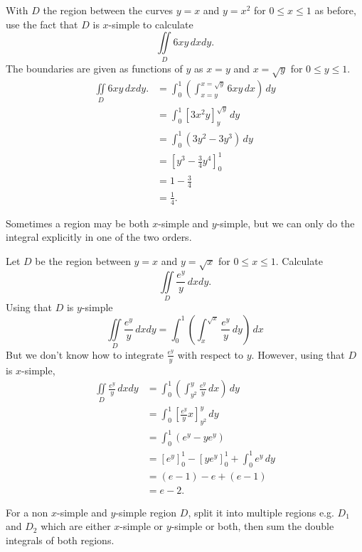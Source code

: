 \documentclass[10pt, a4paper]{article}
\begin{document}
\begin{example}
    With $D$ the region between the curves $y = x$ and $y = x ^ 2$ for $0 \leq x \leq 1$ as before,
    use the fact that $D$ is $x$-simple to calculate
    \[
    \iint\limits_{D}6xy\,dxdy.
    \]
    The boundaries are given as functions of $y$ as $x = y$ and $x = \sqrt{y}$ for $0 \leq y \leq 1$.
    \begin{align*}
        \iint\limits_{D}6xy\,dxdy. &= \int_0^1\left(\int_{x = y}^{x = \sqrt{y}}6xy\,dx\right)\,dy \\
        &= \int_0^1\left[3x ^ 2y\right]_{y}^{\sqrt{y}}\,dy \\
        &= \int_0^1\left(3y ^ 2 - 3y ^ 3\right)\,dy \\
        &= \left[y ^ 3 - \frac{3}{4}y ^ 4\right]_0^1 \\
        &= 1 - \frac{3}{4} \\
        &= \frac{1}{4}.
    \end{align*}
\end{example}

Sometimes a region may be both $x$-simple and $y$-simple,
but we can only do the integral explicitly in one of the two orders.

\begin{example}
    Let $D$ be the region between $y = x$ and $y = \sqrt{x}$ for $0 \leq x \leq 1$.
    Calculate
    \[
    \iint\limits_D\frac{e ^ y}{y}\,dxdy.
    \]
    Using that $D$ is $y$-simple
    \[
    \iint\limits_D\frac{e ^ y}{y}\,dxdy = \int_0^1\left(\int_{x}^{\sqrt{x}}\frac{e ^ y}{y}\,dy\right)\,dx
    \]
    But we don't know how to integrate $\frac{e ^ y}{y}$ with respect to $y$.
    However,
    using that $D$ is $x$-simple,
    \begin{align*}
        \iint\limits_D\frac{e ^ y}{y}\,dxdy &= \int_0^1\left(\int_{y ^ 2}^{y}\frac{e ^ y}{y}\,dx\right)\,dy \\
        &= \int_0^1\left[\frac{e ^ y}{y}x\right]_{y ^ 2}^{y}\,dy \\
        &= \int_0^1\left(e ^ y - ye ^ y\right) \\
        &= \left[e ^ y\right]_0^1 - \left[ye ^ y\right]_0^1 + \int_0^1e ^ y\,dy \\
        &= (e - 1) - e + (e - 1) \\
        &= e - 2.
    \end{align*}
\end{example}

For a non $x$-simple and $y$-simple region $D$,
split it into multiple regions e.g. $D_1$ and $D_2$ which are either $x$-simple or $y$-simple or both,
then sum the double integrals of both regions.
\end{document}
